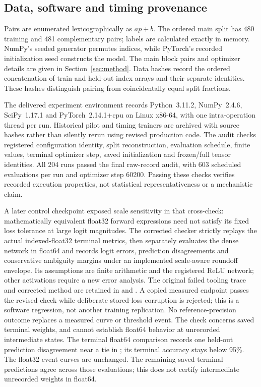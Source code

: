 \subsection{Data, software and timing provenance}
\label{app:reproduction}
Pairs are enumerated lexicographically as $ap+b$. The ordered main split has 480 training and 481 complementary pairs; labels are calculated exactly in memory. NumPy's seeded generator permutes indices, while PyTorch's recorded initialization seed constructs the model. The main block pairs and optimizer details are given in Section~\ref{sec:method}. Data hashes record the ordered concatenation of train and held-out index arrays and their separate identities. These hashes distinguish pairing from coincidentally equal split fractions.

The delivered experiment environment records Python~3.11.2, NumPy~2.4.6, SciPy~1.17.1 and PyTorch~2.14.1+cpu on Linux x86-64, with one intra-operation thread per run. Historical pilot and timing trainers are archived with source hashes rather than silently rerun using revised production code. The audit checks registered configuration identity, split reconstruction, evaluation schedule, finite values, terminal optimizer step, saved initialization and frozen/full tensor identities. All 204 runs passed the final raw-record audit, with 603 scheduled evaluations per run and optimizer step 60200. Passing these checks verifies recorded execution properties, not statistical representativeness or a mechanistic claim.

A later control checkpoint exposed scale sensitivity in that cross-check: mathematically equivalent float32 forward expressions need not satisfy its fixed loss tolerance at large logit magnitudes. The corrected checker strictly replays the actual indexed-float32 terminal metrics, then separately evaluates the dense network in float64 and records logit errors, prediction disagreements and conservative ambiguity margins under an implemented scale-aware roundoff envelope. Its assumptions are finite arithmetic and the registered ReLU network; other activations require a new error analysis. The original failed tooling trace and corrected method are retained in  and . A copied measured endpoint passes the revised check while deliberate stored-loss corruption is rejected; this is a software regression, not another training replication. No reference-precision outcome replaces a measured curve or threshold event. The check concerns saved terminal weights, and cannot establish float64 behavior at unrecorded intermediate states. The terminal float64 comparison records one held-out prediction disagreement near a tie in ; its terminal accuracy stays below 95\%. The float32 event curves are unchanged. The remaining saved terminal predictions agree across those evaluations; this does not certify intermediate unrecorded weights in float64.

